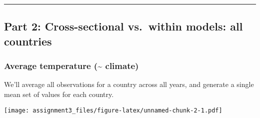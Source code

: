\documentclass[
]{article}
\newenvironment{Shaded}{\begin{snugshade}}{\end{snugshade}}
\newcommand{\AttributeTok}[1]{\textcolor[rgb]{0.77,0.63,0.00}{#1}}
\newcommand{\CommentTok}[1]{\textcolor[rgb]{0.56,0.35,0.01}{\textit{#1}}}
\newcommand{\DecValTok}[1]{\textcolor[rgb]{0.00,0.00,0.81}{#1}}
\newcommand{\FunctionTok}[1]{\textcolor[rgb]{0.00,0.00,0.00}{#1}}
\newcommand{\NormalTok}[1]{#1}
\newcommand{\OtherTok}[1]{\textcolor[rgb]{0.56,0.35,0.01}{#1}}
\newcommand{\SpecialCharTok}[1]{\textcolor[rgb]{0.00,0.00,0.00}{#1}}
\newcommand{\StringTok}[1]{\textcolor[rgb]{0.31,0.60,0.02}{#1}}
\begin{document}
\begin{center}\rule{0.5\linewidth}{0.5pt}\end{center}

\hypertarget{part-2-cross-sectional-vs.-within-models-all-countries}{%
\subsection{Part 2: Cross-sectional vs.~within models: all
countries}\label{part-2-cross-sectional-vs.-within-models-all-countries}}

\hypertarget{average-temperature-climate}{%
\subsubsection{Average temperature (\textasciitilde{}
climate)}\label{average-temperature-climate}}

We'll average all observations for a country across all years, and
generate a single mean set of values for each country.

\begin{Shaded}
\end{Shaded}

\texttt{[image: assignment3\_files/figure-latex/unnamed-chunk-2-1.pdf]}
\end{document}
